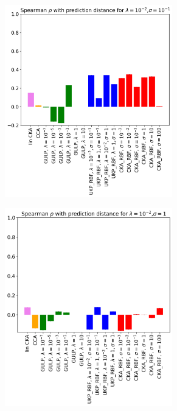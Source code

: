 \documentclass{article}
\theoremstyle{plain}
\begin{document}
\begin{figure}[!h]
    \centering
    \begin{subfigure}[b]{0.45\textwidth}
        \includegraphics[width=0.8\textwidth]{Appendix figures/mnist_experiments/krrgen/png/generalization(includingCKARBF)_lambda0.01_sigma0.1.png}
    \end{subfigure}
    \hfill
    \begin{subfigure}[b]{0.45\textwidth}
        \includegraphics[width=0.8\textwidth]{Appendix figures/mnist_experiments/krrgen/png/generalization(includingCKARBF)_lambda0.01_sigma1.png}
    \end{subfigure}
    

\end{figure}
\end{document}
